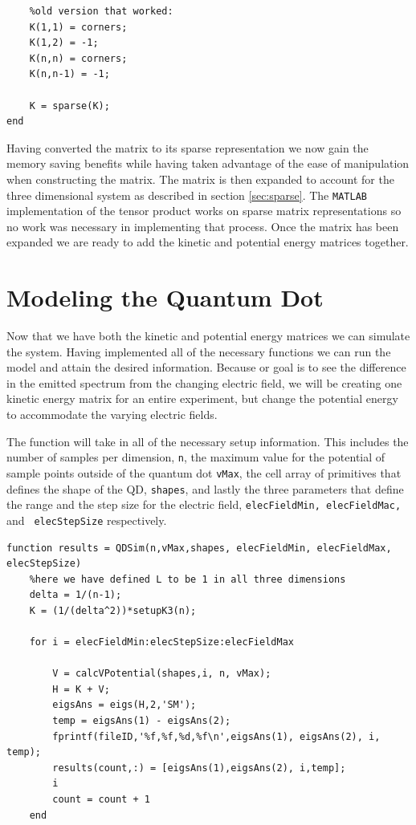 \documentclass[authoryearcitations]{UoYCSproject}
\begin{document}
\begin{lstlisting}[caption={Second two parts of setting the coefficients}, label=lst:cetCoeff2, firstnumber=11]	
	%Ensure that the corners of the matrix are what we desire
	%old version that worked:
	K(1,1) = corners;
	K(1,2) = -1;
	K(n,n) = corners;
	K(n,n-1) = -1;
	
	K = sparse(K);
end	
\end{lstlisting}

Having converted the matrix to its sparse representation we now gain the memory saving benefits while having taken
advantage of the ease of manipulation when constructing the matrix. The matrix is then expanded to account for the
three dimensional system as described in section \ref{sec:sparse}. The \verb+MATLAB+ implementation of the tensor product works
on sparse matrix representations so no work was necessary in implementing that process. Once the matrix has been
expanded we are ready to add the kinetic and potential energy matrices together.  


\section{Modeling the Quantum Dot}
Now that we have both the kinetic and potential energy matrices we can simulate the system. Having implemented 
all of the necessary functions we can run the model and attain the desired information. 
Because or goal is to see the difference in the emitted spectrum from the changing electric field, we will be 
creating one kinetic energy matrix for an entire experiment, but change the potential energy 
to accommodate the varying electric fields. 

The function will take in all of the necessary setup information. This includes the number of samples per dimension,
\verb+n+, the maximum value for the potential of sample points outside of the quantum dot \verb+vMax+, the cell array of 
primitives that defines the shape of the QD, \verb+shapes+, and lastly the three parameters that define the range and
the step size for the electric field, \verb+elecFieldMin, elecFieldMac, + and \verb+ elecStepSize+ respectively. 

\begin{lstlisting}[caption={Setup for running the model}, label=lst:QdSim1]
function results = QDSim(n,vMax,shapes, elecFieldMin, elecFieldMax, elecStepSize)
	%here we have defined L to be 1 in all three dimensions
	delta = 1/(n-1);
	K = (1/(delta^2))*setupK3(n);
	
	for i = elecFieldMin:elecStepSize:elecFieldMax
		
	    V = calcVPotential(shapes,i, n, vMax);
	    H = K + V;
	    eigsAns = eigs(H,2,'SM');
	    temp = eigsAns(1) - eigsAns(2);
	    fprintf(fileID,'%f,%f,%d,%f\n',eigsAns(1), eigsAns(2), i, temp);
	    results(count,:) = [eigsAns(1),eigsAns(2), i,temp];
		i
		count = count + 1
	end
\end{lstlisting}
\end{document}
